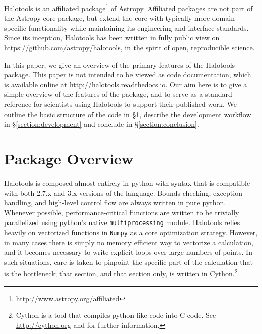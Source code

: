 \documentclass[twocolumn, tighten]{aastex6}
\begin{document}
Halotools is an affiliated package\footnote{\url{http://www.astropy.org/affiliated}} of Astropy. Affiliated packages are not part of the Astropy core package, but extend the core with typically more domain-specific functionality while maintaining its engineering and interface standards. Since its inception, Halotools has been written in fully public view on {\url{https://github.com/astropy/halotools}}, in the spirit of open, reproducible science. 

In this paper, we give an overview of the primary features of the Halotools package. This paper is not intended to be viewed as code documentation, which is available online at {\url{http://halotools.readthedocs.io}}. Our aim here is to give a simple overview of the features of the package, and to serve as a standard reference for scientists using Halotools to support their published work. We outline the basic structure of the code in \S\ref{section:overview}, describe the development workflow in \S\ref{section:development} and conclude in \S\ref{section:conclusion}. 

\section{Package Overview}
\label{section:overview}

Halotools is composed almost entirely in python with syntax that is compatible with both 2.7.x and 3.x versions of the language. Bounds-checking, exception-handling, and high-level control flow are always written in pure python. Whenever possible, performance-critical functions are written to be trivially parallelized using python's native {\tt multiprocessing} module. Halotools relies heavily on vectorized functions in {\tt Numpy} as a core optimization strategy. However, in many cases there is simply no memory efficient way to vectorize a calculation, and it becomes necessary to write explicit loops over large numbers of points. In such situations, care is taken to pinpoint the specific part of the calculation that is the bottleneck; that section, and that section only, is written in Cython.\footnote{Cython is a tool that compiles python-like code into C code. See \url{http://cython.org} and \citet{cython} for further information.}
\end{document}
